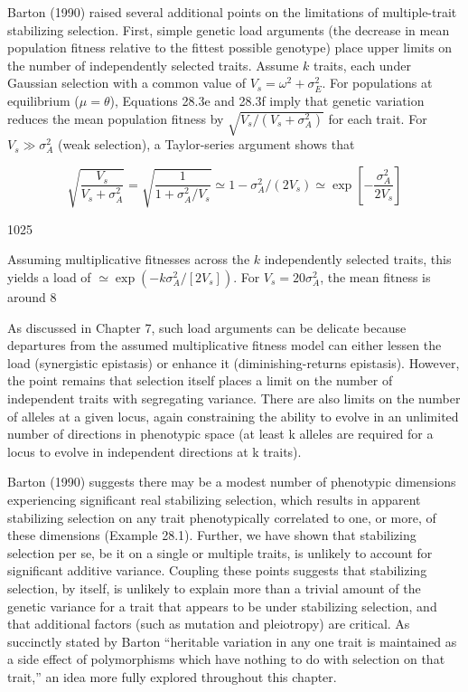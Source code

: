 \documentclass{article}
\begin{document}
Barton (1990) raised several additional points on the limitations of multiple-trait stabilizing selection. First, simple genetic load arguments (the decrease in mean population fitness relative to the fittest possible genotype) place upper limits on the number of independently selected traits. Assume $k$ traits, each under Gaussian selection with a common value of $V_s = \omega^2 + \sigma_E^2$. For populations at equilibrium ($\mu = \theta$), Equations 28.3e and 28.3f imply that genetic variation reduces the mean population fitness by $\sqrt{V_s/(V_s + \sigma_A^2)}$ for each trait. For $V_s \gg \sigma_A^2$ (weak selection), a Taylor-series argument shows that

\begin{equation}
\sqrt{\frac{V_{s}}{V_{s}+\sigma_{A}^{2}}}=\sqrt{\frac{1}{1+\sigma_{A}^{2}/V_{s}}}\simeq1-\sigma_{A}^{2}/(2V_{s})\simeq\exp\left[-\frac{\sigma_{A}^{2}}{2V_{s}}\right]
\end{equation}

1025

Assuming multiplicative fitnesses across the $k$ independently selected traits, this yields a load of $\simeq \exp(-k \sigma_A^2 / [2V_s])$. For $V_s = 20\sigma_A^2$, the mean fitness is around 8%

As discussed in Chapter 7, such load arguments can be delicate because departures from the assumed multiplicative fitness model can either lessen the load (synergistic epistasis) or enhance it (diminishing-returns epistasis). However, the point remains that selection itself places a limit on the number of independent traits with segregating variance. There are also limits on the number of alleles at a given locus, again constraining the ability to evolve in an unlimited number of directions in phenotypic space (at least k alleles are required for a locus to evolve in independent directions at k traits).

Barton (1990) suggests there may be a modest number of phenotypic dimensions experiencing significant real stabilizing selection, which results in apparent stabilizing selection on any trait phenotypically correlated to one, or more, of these dimensions (Example 28.1). Further, we have shown that stabilizing selection per se, be it on a single or multiple traits, is unlikely to account for significant additive variance. Coupling these points suggests that stabilizing selection, by itself, is unlikely to explain more than a trivial amount of the genetic variance for a trait that appears to be under stabilizing selection, and that additional factors (such as mutation and pleiotropy) are critical. As succinctly stated by Barton “heritable variation in any one trait is maintained as a side effect of polymorphisms which have nothing to do with selection on that trait,” an idea more fully explored throughout this chapter.
\end{document}
